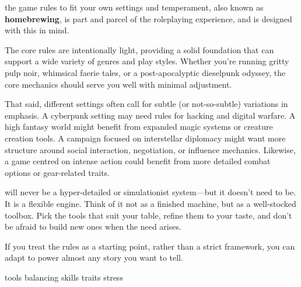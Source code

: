 
 the game rules to fit your own settings and temperament, also known as \textbf{homebrewing}, is part and parcel of the roleplaying experience, and \wyrd is designed with this in mind.  

The core rules are intentionally light, providing a solid foundation that can support a wide variety of genres and play styles. Whether you're running gritty pulp noir, whimsical faerie tales, or a post-apocalyptic dieselpunk odyssey, the core mechanics should serve you well with minimal adjustment.

That said, different settings often call for subtle (or not-so-subtle) variations in emphasis. A cyberpunk setting may need rules for hacking and digital warfare. A high fantasy world might benefit from expanded magic systems or creature creation tools. A campaign focused on interstellar diplomacy might want more structure around social interaction, negotiation, or influence mechanics. Likewise, a game centred on intense action could benefit from more detailed combat options or gear-related traits.

\wyrd will never be a hyper-detailed or simulationist system—but it doesn't need to be. It is a flexible engine. Think of it not as a finished machine, but as a well-stocked toolbox. Pick the tools that suit your table, refine them to your taste, and don't be afraid to build new ones when the need arises. 

If you treat the rules as a starting point, rather than a strict framework, you can adapt \wyrd to power almost any story you want to tell.


{tools}
{balancing}
{skills}
{traits}
{stress}





